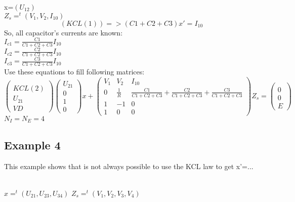 \documentclass[10pt]{article}
\begin{document}
x=$(U_{12})$\\
$Z_{s}=^{t}(V_{1},V_{2},I_{10})$\\
\[(KCL(1))=>(C1+C2+C3)x'=I_{10}\]
So, all capacitor's currents are known:\\
$I_{c1}=\frac{C1}{C1+C2+C3}I_{10}$\\
$I_{c2}=\frac{C2}{C1+C2+C3}I_{10}$\\
$I_{c3}=\frac{C3}{C1+C2+C3}I_{10}$\\
Use these equations to fill following matrices:\\
\[\left(\begin{array}{c}
  \\
KCL(2)\\U_{21}\\VD
\end{array}\right)
\left(\begin{array}{c}
U_{21}\\
\hline
0\\
1\\
0
\end{array}\right)x+
\left(\begin{array}{ccc}
V_{1}&V_{2}&I_{10}\\
\hline
0&\frac{1}{R}&\frac{C1}{C1+C2+C3}+\frac{C2}{C1+C2+C3}+\frac{C3}{C1+C2+C3}\\
1&-1&0\\
1&0&0
\end{array}\right)Z_{s}=
\left(\begin{array}{c}
\\0\\0\\E
\end{array}\right)
\]
$N_{I}=N_{E}=4$
\newpage
\subsection{Example 4}
This example shows that is not always possible to use the KCL law to get x'=...\\
\begin{figure}[h]
\centerline{
 \scalebox{0.9}{
    
 }
}\end{figure}\\
$x=^{t}(U_{21},U_{23},U_{34})$
$Z_{s}=^{t}(V_{1},V_{2},V_{3},V_{4})$
\end{document}
